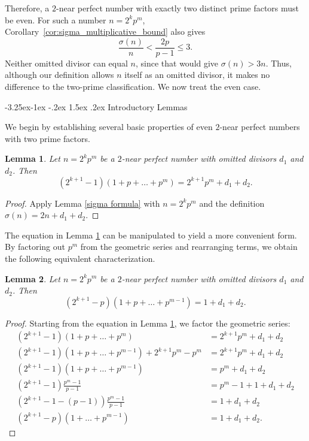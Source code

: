 \documentclass[10pt]{article}
\makeatletter
\renewcommand\subsection{\@startsection{subsection}{2}{\z@}
{-3.25ex\@plus -1ex \@minus -.2ex}
{1.5ex \@plus .2ex}
{\normalfont\normalsize\bfseries\boldmath}}
\newtheorem{lemma}{Lemma}
\theoremstyle{definition}
\makeatother
\begin{document}
Therefore, a $2$-near perfect number with exactly two distinct prime
factors must be even. For such a number $n=2^kp^m$,
Corollary~\ref{cor:sigma_multiplicative_bound} also gives
\[
\frac{\sigma(n)}n<\frac{2p}{p-1}\le3.
\]
Neither omitted divisor can equal $n$, since that would give
$\sigma(n)>3n$. Thus, although our definition allows $n$ itself as
an omitted divisor, it makes no difference to the two-prime
classification. We now treat the even case.



\subsection{Introductory Lemmas}

We begin by establishing several basic properties of even $2$-near perfect numbers with two prime factors.

\begin{lemma}\label{lem:basic_equation}
    Let $n=2^kp^m$ be a $2$-near perfect number with omitted divisors $d_1$ and $d_2$. Then
    \[(2^{k+1}-1)(1+p+\ldots+p^m)=2^{k+1}p^m+d_1+d_2.\]
\end{lemma}
\begin{proof}
    Apply Lemma \ref{sigma formula} with $n=2^kp^m$ and the definition $\sigma(n)=2n+d_1+d_2$.
\end{proof}

The equation in Lemma \ref{lem:basic_equation} can be manipulated to yield a more convenient form. By factoring out $p^m$ from the geometric series and rearranging terms, we obtain the following equivalent characterization.

\begin{lemma}\label{lem:equivalent_form}
    Let $n=2^kp^m$ be a $2$-near perfect number with omitted divisors $d_1$ and $d_2$. Then 
    \[(2^{k+1}-p)(1+p+\ldots+p^{m-1})=1+d_1+d_2.\]
\end{lemma}
\begin{proof}
   Starting from the equation in Lemma \ref{lem:basic_equation}, we factor the geometric series:
    \begin{align*}
    (2^{k+1}-1)(1+p+\ldots+p^m)&=2^{k+1}p^m+d_1+d_2\\
    (2^{k+1}-1)(1+p+\ldots+p^{m-1})+2^{k+1}p^m-p^m&=2^{k+1}p^m+d_1+d_2\\
    (2^{k+1}-1)(1+p+\ldots+p^{m-1})&=p^m+d_1+d_2\\
    (2^{k+1}-1)\frac{p^m-1}{p-1}&=p^m-1+1+d_1+d_2\\
    (2^{k+1}-1-(p-1))\frac{p^m-1}{p-1}&=1+d_1+d_2\\
    (2^{k+1}-p)(1+\ldots+p^{m-1})&=1+d_1+d_2.
    \end{align*}
\end{proof}
\end{document}
